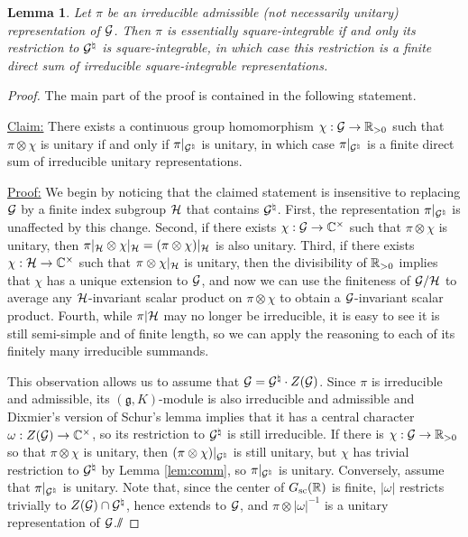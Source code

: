\documentclass{article}
\newtheorem{lem}[thm]{Lemma}
\theoremstyle{definition}
\numberwithin{equation}{section}
\renewcommand{\-}{\hyp{}}
\newcommand{\g}{\mathfrak g}
\begin{document}
\begin{lem} \label{lem:eds-equiv}
  Let $\pi$ be an irreducible admissible (not necessarily unitary) representation of $\mathcal{G}$.
  Then $\pi$ is essentially square-integrable if and only its restriction to $\mathcal{G}^\natural$ is square-integrable, in which case this restriction is a finite direct sum of irreducible square-integrable representations.
\end{lem}
\begin{proof}
The main part of the proof is contained in the following statement.

\ul{Claim:} There exists a continuous group homomorphism $\chi : \mathcal{G} \to \mathbb{R}_{>0}$ such that $\pi\otimes\chi$ is unitary if and only if $\pi|_{\mathcal{G}^{\natural}}$ is unitary, in which case $\pi|_{\mathcal{G}^{\natural}}$ is a finite direct sum of irreducible unitary representations.

\ul{Proof:} We begin by noticing that the claimed statement is insensitive to replacing $\mathcal{G}$ by a finite index subgroup $\mathcal{H}$ that contains $\mathcal{G}^\natural$. First, the representation $\pi|_{\mathcal{G}^\natural}$ is unaffected by this change. Second, if there exists $\chi : \mathcal{G} \to \mathbb{C}^\times$ such that $\pi \otimes \chi$ is unitary, then $\pi|_{\mathcal{H}} \otimes \chi|_{\mathcal{H}} = (\pi\otimes\chi)|_{\mathcal{H}}$ is also unitary. Third, if there exists $\chi : \mathcal{H} \to \mathbb{C}^\times$ such that $\pi \otimes \chi|_{\mathcal{H}}$ is unitary, then the divisibility of $\mathbb{R}_{>0}$ implies that $\chi$ has a unique extension to $\mathcal{G}$, and now we can use the finiteness of $\mathcal{G}/\mathcal{H}$ to average any $\mathcal{H}$-invariant scalar product on $\pi\otimes\chi$ to obtain a $\mathcal{G}$-invariant scalar product. Fourth, while $\pi|\mathcal{H}$ may no longer be irreducible, it is easy to see it is still semi-simple and of finite length,
so we can apply the reasoning to each of its finitely many irreducible summands.

This observation allows us to assume that
$\mathcal{G}=\mathcal{G}^\natural \cdot Z(\mathcal{G})$. Since $\pi$ is irreducible
and admissible, its $(\g,K)$-module is also irreducible and admissible
\cite[Section 0.3]{vogan_green}
 and Dixmier's version of Schur's lemma
\cite[Lemma 0.5.3]{wallach} implies that it has a central character
$\omega : Z(\mathcal{G}) \to \mathbb{C}^\times$, so its restriction to
$\mathcal{G}^\natural$ is still irreducible. If there is
$\chi : \mathcal{G} \to \mathbb{R}_{>0}$ so that $\pi \otimes \chi$ is unitary,
then $(\pi\otimes\chi)|_{\mathcal{G}^\natural}$ is still unitary, but
$\chi$ has trivial restriction to $\mathcal{G}^\natural$ by Lemma
\ref{lem:comm}, so $\pi|_{\mathcal{G}^\natural}$ is unitary. Conversely,
assume that $\pi|_{\mathcal{G}^\natural}$ is unitary. Note that, since the
center of $G_{\textrm{sc}}(\mathbb{R})$ is finite, $|\omega|$ restricts trivially to
$Z(\mathcal{G}) \cap \mathcal{G}^\natural$, hence extends to $\mathcal{G}$, and
$\pi\otimes|\omega|^{-1}$ is a unitary representation of
$\mathcal{G}$.\hfill $\sslash$


\end{proof}
\end{document}
